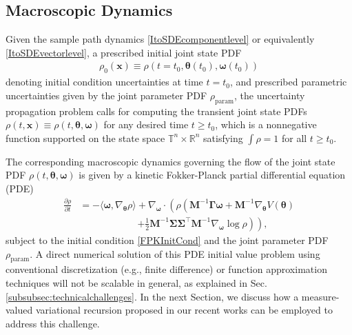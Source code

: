 \documentclass[10pt,twocolumn]{IEEEtran}
\begin{document}
\subsection{Macroscopic Dynamics}\label{subsec:macroscopic}
Given the sample path dynamics \eqref{ItoSDEcomponentlevel} or equivalently \eqref{ItoSDEvectorlevel}, a prescribed initial joint state PDF 
\begin{align}
\rho_{0}(\bm{x})\equiv\rho(t=t_{0},\bm{\theta}(t_{0}),\bm{\omega}(t_{0}))
\label{FPKInitCond}	
\end{align} 
denoting initial condition uncertainties at time $t=t_{0}$, and prescribed parametric uncertainties given by the joint parameter PDF $\rho_{\text{param}}$, the uncertainty propagation problem calls for computing the transient joint state PDFs $\rho(t,\bm{x})\equiv\rho(t,\bm{\theta},\bm{\omega})$ for any desired time $t \geq t_{0}$, which is a nonnegative function supported on the state space $\mathbb{T}^{n} \times \mathbb{R}^{n}$ satisfying $\int \rho = 1$ for all $t\geq t_{0}$.

The corresponding macroscopic dynamics governing the flow of the joint state PDF $\rho(t,\bm{\theta},\bm{\omega})$ is given by a kinetic Fokker-Planck partial differential equation (PDE)
\begin{align}
\frac{\partial \rho}{\partial t} &= - \langle \bm{\omega},\nabla_{\bm{\theta}}\rho \rangle  + \nabla_{\bm{\omega}} \cdot \left( \rho \left( \bm{M}^{-1}\bm{\Gamma}\bm{\omega} + \bm{M}^{-1}\nabla_{\bm{\theta}}V(\bm{\theta}) \right.\right.\nonumber\\
&\qquad\qquad\qquad \left.\left. +\frac{1}{2} \bm{M}^{-1}\bm{\Sigma}\bm{\Sigma}^{\top}\bm{M}^{-1} \nabla_{\bm{\omega}} \log \rho \right) \right),
\label{KineticFPK}	
\end{align}
subject to the initial condition \eqref{FPKInitCond} and the joint parameter PDF $\rho_{\text{param}}$. A direct numerical solution of this PDE initial value problem using conventional discretization (e.g., finite difference) or function approximation techniques will not be scalable in general, as explained in Sec. \ref{subsubsec:technicalchallenges}. In the next Section, we discuss how a measure-valued variational recursion proposed in our recent works \cite{caluya2019ACC,caluya2019TAC,halder2020hopfield,caluya2021TAC} can be employed to address this challenge.
\end{document}
